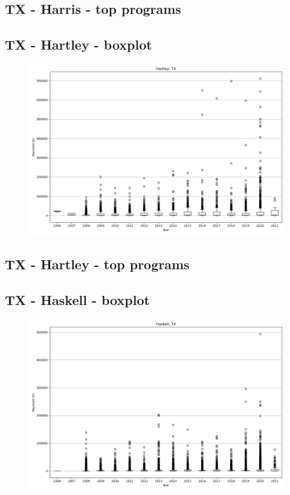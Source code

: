\subsection*{TX - Harris - top programs}

\newpage
\subsection*{TX - Hartley - boxplot}
\begin{figure}[h]
\centering
\includegraphics[width=7in]{../output/boxplots/counties/Hartley-TX_boxplot.png}
\end{figure}


\subsection*{TX - Hartley - top programs}

\newpage
\subsection*{TX - Haskell - boxplot}
\begin{figure}[h]
\centering
\includegraphics[width=7in]{../output/boxplots/counties/Haskell-TX_boxplot.png}
\end{figure}


